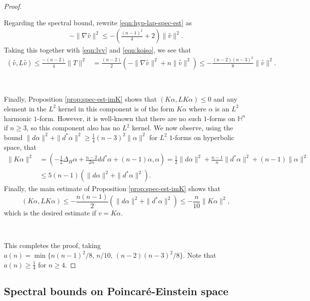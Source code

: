 \documentclass[10pt,reqno]{amsart}
\newcommand{\ttv}{\stackrel{\circ}{v}}
\begin{document}
\begin{proof}
\

Regarding the spectral bound, rewrite \eqref{eqn:hyp-lap-spec-est} as
\begin{align*}
- \|\nabla \ttv\|^2 \leq - \left( \frac{(n-1)^2}{4} + 2  \right) \|\ttv\|^2.
\end{align*}
Taking this together with \eqref{eqn:lvv} and \eqref{eqn:koiso}, we see that
\begin{align} \label{eqn:fin-est-tt}
(\ttv,L\ttv) \leq \frac{-(n-2)}{4} \|T\|^2 &= \frac{(n-2)}{2} \left( -\| \nabla \ttv\|^2 +  n \|\ttv\|^2 \right) \leq-\frac{(n-2)(n-3)^2}{8} \|\ttv\|^2.
\end{align}

\ 

Finally, Proposition \ref{prop:spec-est-imK} shows that $(K\alpha, L K \alpha) \leq 0$ and any element in the $L^2$ kernel in this component is of the form $K \alpha$ 
where $\alpha$ is an $L^2$ harmonic $1$-form.  However, it is well-known that there are no such $1$-forms on $\mathbb H^n$ if $n \geq 3$, so this component also has no $L^2$ kernel.  
We now observe, using the bound $\|d\alpha\|^2 + \|d^* \alpha\|^2 \geq \tfrac14 (n-3)^2 \|\alpha\|^2$ for $L^2$ $1$-forms on hyperbolic space,   that
\begin{align*}
\|K\alpha\|^2 & = ( -\tfrac12 \Delta_H \alpha + \frac{n-2}{2n} dd^* \alpha + (n-1)\alpha, \alpha) = \frac12 \|d\alpha\|^2 + \frac{n-1}{n}\|d^*\alpha\|^2 + (n-1)\|\alpha\|^2 \\ 
& \leq 5(n-1) ( \|d\alpha\|^2 + \|d^*\alpha\|^2).
\end{align*}
Finally, the main estimate of Proposition \ref{prop:spec-est-imK} shows that
\[
(K\alpha, L K\alpha) \leq -\frac{n(n-1)}{2} ( \|d\alpha\|^2 + \|d^*\alpha\|^2  )\leq - \frac{n}{10} \|K\alpha\|^2,
\]
which is the desired estimate if $v = K\alpha$. 

\ 

This completes the proof, taking $a(n) = \min \{ n(n-1)^2/8, \,n/10,\, (n-2)(n-3)^2/8\}.$  Note that $a(n) \geq \frac{1}{4}$ for  $n \geq 4$. 
\end{proof}

\subsection{Spectral bounds on Poincar\'e-Einstein space}
\label{sec:spec bds PE}


\
\end{document}
